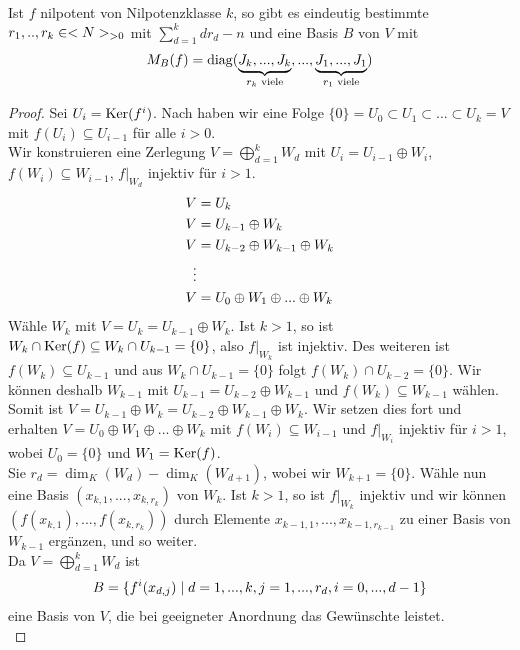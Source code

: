 \begin{proposition}
	Ist $f$ nilpotent von Nilpotenzklasse $k$, so gibt es eindeutig bestimmte $r_1,..,r_k\in<N>_{>0}$ mit $\sum\limits_{d=1}^k dr_d-n$ und eine Basis $B$ von $V$ mit 
	\begin{align}
		M_B(f)=\operatorname{diag}(\underbrace{J_k,...,J_k}_{r_k\text{ viele}},...,\underbrace{J_1,...,J_1}_{r_1\text{ viele}})\notag
	\end{align}
\end{proposition}
\begin{proof}
	Sei $U_i=\operatorname{Ker}(f^i)$. Nach  haben wir eine Folge $\{0\}=U_0\subset U_1\subset ...\subset U_k=V$ mit $f(U_i)\subseteq U_{i-1}$ für alle $i>0$. \\
	Wir konstruieren eine Zerlegung $V=\bigoplus\limits_{d=1}^k W_d$ mit $U_i=U_{i-1}\oplus W_i$, $f(W_i)\subseteq W_{i-1}$, $f\vert_{W_d}$ injektiv für $i>1$.
	\begin{align}
		V&= U_k\notag \\
		V&= U_{k-1}\oplus W_k \notag \\
		V&= U_{k-2}\oplus W_{k-1}\oplus W_k \notag \\
		\vdots \notag \\
		V&= U_0 \oplus W_1\oplus ... \oplus W_k\notag
	\end{align}
	Wähle $W_k$ mit $V=U_k=U_{k-1}\oplus W_k$. Ist $k>1$, so ist $W_k\cap \operatorname{Ker}(f)\subseteq W_k\cap U_{k-1}=\{0\}$, also $f\vert_{W_k}$ ist injektiv. Des weiteren ist $f(W_k)\subseteq U_{k-1}$ und aus $W_k\cap U_{k-1}=\{0\}$ folgt $f(W_k)\cap U_{k-2}=\{0\}$. Wir können deshalb $W_{k-1}$ mit $U_{k-1}=U_{k-2}\oplus W_{k-1}$ und $f(W_k)\subseteq W_{k-1}$ wählen. Somit ist $V=U_{k-1}\oplus W_k=U_{k-2}\oplus W_{k-1}\oplus W_k$. Wir setzen dies fort und erhalten $V= U_0 \oplus W_1\oplus ... \oplus W_k$ mit $f(W_i)\subseteq W_{i-1}$ und $f\vert_{W_i}$ injektiv für $i>1$, wobei $U_0=\{0\}$ und $W_1=\operatorname{Ker}(f)$. \\
	Sie $r_d=\dim_K(W_d)-\dim_K(W_{d+1})$, wobei wir $W_{k+1}=\{0\}$. Wähle nun eine Basis $(x_{k,1},...,x_{k,r_k})$ von $W_k$. Ist $k>1$, so ist $f\vert_{W_k}$ injektiv und wir können $(f(x_{k,1}),...,f(x_{k,r_k}))$ durch Elemente $x_{k-1,1},...,x_{k-1,r_{k-1}}$ zu einer Basis von $W_{k-1}$ ergänzen, und so weiter.\\
	Da $V=\bigoplus\limits_{d=1}^k W_d$ ist
	\begin{align}
		B=\{f^i(x_{d,j})\mid d=1,...,k,j=1,...,r_d,i=0,...,d-1\}\notag
	\end{align}
	eine Basis von $V$, die bei geeigneter Anordnung das Gewünschte leistet. \\

\end{proof}
